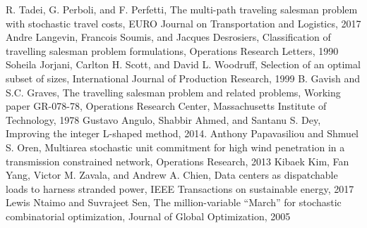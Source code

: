 \begin{thebibliography}{9}
	R. Tadei, G. Perboli, and F. Perfetti, The multi-path traveling salesman problem with stochastic travel costs, EURO Journal on Transportation and Logistics, 2017
	Andre Langevin, Francois Soumis, and Jacques Desrosiers, Classification of travelling salesman problem formulations, Operations Research Letters, 1990
	Soheila Jorjani, Carlton H. Scott, and David L. Woodruff, Selection of an optimal subset of sizes, International Journal of Production Research, 1999	
	B. Gavish and S.C. Graves, The travelling salesman problem and related problems, Working paper GR-078-78, Operations Research Center, Massachusetts Institute of Technology, 1978
	Gustavo Angulo, Shabbir Ahmed, and Santanu S. Dey, Improving the integer L-shaped method, 2014.
	Anthony Papavasiliou and Shmuel S. Oren, Multiarea stochastic unit commitment for high wind penetration in a transmission constrained network, Operations Research, 2013
	Kibaek Kim, Fan Yang, Victor M. Zavala, and Andrew A. Chien, Data centers as dispatchable loads to harness stranded power, IEEE Transactions on sustainable energy, 2017
	Lewis Ntaimo and Suvrajeet Sen, The million-variable ``March'' for stochastic combinatorial optimization, Journal of Global Optimization, 2005
\end{thebibliography}


